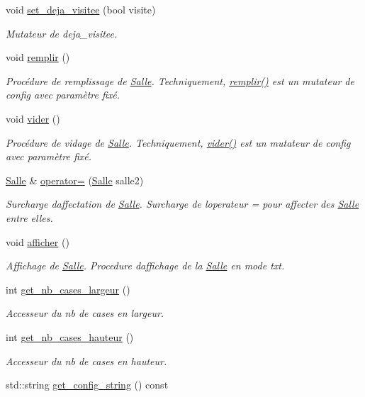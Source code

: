\begin{DoxyCompactItemize}
void \hyperlink{classSalle_a2c5dfa8f0e6b6c427203812d8d91524a}{set\+\_\+deja\+\_\+visitee} (bool visite)
\begin{DoxyCompactList}\small\item\em Mutateur de {\itshape deja\+\_\+visitee}. \end{DoxyCompactList}\item 
void \hyperlink{classSalle_ae6fd7211225455d887859f983e3bddce}{remplir} ()
\begin{DoxyCompactList}\small\item\em Procédure de remplissage de \hyperlink{classSalle}{Salle}. Techniquement, \hyperlink{classSalle_ae6fd7211225455d887859f983e3bddce}{remplir()} est un mutateur de {\itshape config} avec paramètre fixé. \end{DoxyCompactList}\item 
void \hyperlink{classSalle_ae8248a5ded8514be67a29efdeb70af96}{vider} ()
\begin{DoxyCompactList}\small\item\em Procédure de vidage de \hyperlink{classSalle}{Salle}. Techniquement, \hyperlink{classSalle_ae8248a5ded8514be67a29efdeb70af96}{vider()} est un mutateur de {\itshape config} avec paramètre fixé. \end{DoxyCompactList}\item 
\hyperlink{classSalle}{Salle} \& \hyperlink{classSalle_a315947e357a3fd958b40eb087a82c4d7}{operator=} (\hyperlink{classSalle}{Salle} salle2)
\begin{DoxyCompactList}\small\item\em Surcharge d\textquotesingle{}affectation de \hyperlink{classSalle}{Salle}. Surcharge de l\textquotesingle{}operateur = pour affecter des \hyperlink{classSalle}{Salle} entre elles. \end{DoxyCompactList}\item 
void \hyperlink{classSalle_a50ed839f1a93753fddf6171ef343a0bb}{afficher} ()
\begin{DoxyCompactList}\small\item\em Affichage de \hyperlink{classSalle}{Salle}. Procedure d\textquotesingle{}affichage de la \hyperlink{classSalle}{Salle} en mode txt. \end{DoxyCompactList}\item 
int \hyperlink{classSalle_a938849a06f5906cc6b3a66e979f02a9a}{get\+\_\+nb\+\_\+cases\+\_\+largeur} ()
\begin{DoxyCompactList}\small\item\em Accesseur du nb de cases en largeur. \end{DoxyCompactList}\item 
int \hyperlink{classSalle_a80ca41c533d0ec567b1d4e78779225ba}{get\+\_\+nb\+\_\+cases\+\_\+hauteur} ()
\begin{DoxyCompactList}\small\item\em Accesseur du nb de cases en hauteur. \end{DoxyCompactList}\item 
std\+::string \hyperlink{classSalle_ac8e706275a4d3545eb33a6f446a554a1}{get\+\_\+config\+\_\+string} () const 
\end{DoxyCompactItemize}


